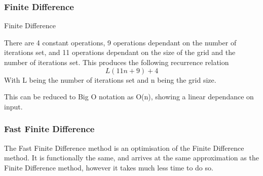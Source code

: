 \documentclass[aps,twocolumn,pre,nofootinbib,10pt]{revtex4-1}
\begin{document}
\subsubsection{Finite Difference}
\begin{algorithm}
    \caption{Finite Difference}
    \label{alg:fd}
    \begin{algorithmic}[1]
                    \EndIf
                    \EndIf
                \EndFor
            \EndFor
            \State {}
        \EndFunction
            \EndWhile
            \State {}
        \EndFunction
    \end{algorithmic}
\end{algorithm}

There are 4 constant operations, 9 operations dependant on the number of iterations set, and 11 operations dependant on the size of the grid and the number of iterations set. This produces the following recurrence relation \[L(11n+9)+4\] With L being the number of iterations set and n being the grid size.

This can be reduced to Big O notation as O(n), showing a linear dependance on input.

\subsubsection{Fast Finite Difference}

The Fast Finite Difference method is an optimisation of the Finite Difference method. It is functionally the same, and arrives at the same approximation as the Finite Difference method, however it takes much less time to do so.
\end{document}
